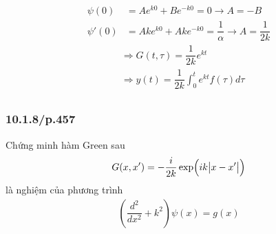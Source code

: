 \documentclass{report}
\newcommand{\f}[2]{\dfrac{#1}{#2}}
\begin{document}
\begin{enumerate}[label=(\alph*)]
	      \begin{align*}
		      \psi(0)  & = A e^{k0} + B e^{-k0} = 0  \rightarrow A = - B                     \\
		      \psi'(0) & = Ak e^{k0} + Ak e^{-k0} = \f{1}{\alpha}  \rightarrow A = \f{1}{2k}
	      \end{align*}
	      \begin{align*}
		       & \Rightarrow G(t,\tau) = \f{1}{2k} e^{kt}                       \\
		       & \Rightarrow y(t) = \f{1}{2k} \int_{0}^{t} e^{kt} f(\tau) d\tau \\
	      \end{align*}
\end{enumerate}
\subsubsection{10.1.8/p.457}
Chứng minh hàm Green sau
\begin{align*}
	G(x,x') = -\f{i}{2k}\exp (ik \abs{x - x'})
\end{align*}
là nghiệm của phương trình
\begin{align*}
	\left( \f{d^2}{dx^2} + k^2 \right) \psi(x) = g(x)
\end{align*}
\end{document}
